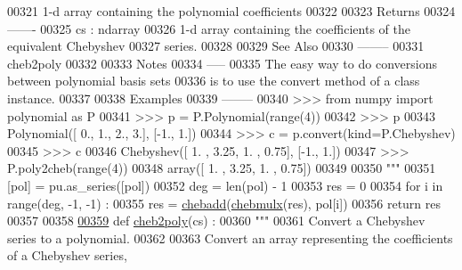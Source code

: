 \begin{DoxyCode}
00321 \textcolor{stringliteral}{        1-d array containing the polynomial coefficients}
00322 \textcolor{stringliteral}{}
00323 \textcolor{stringliteral}{    Returns}
00324 \textcolor{stringliteral}{    -------}
00325 \textcolor{stringliteral}{    cs : ndarray}
00326 \textcolor{stringliteral}{        1-d array containing the coefficients of the equivalent Chebyshev}
00327 \textcolor{stringliteral}{        series.}
00328 \textcolor{stringliteral}{}
00329 \textcolor{stringliteral}{    See Also}
00330 \textcolor{stringliteral}{    --------}
00331 \textcolor{stringliteral}{    cheb2poly}
00332 \textcolor{stringliteral}{}
00333 \textcolor{stringliteral}{    Notes}
00334 \textcolor{stringliteral}{    -----}
00335 \textcolor{stringliteral}{    The easy way to do conversions between polynomial basis sets}
00336 \textcolor{stringliteral}{    is to use the convert method of a class instance.}
00337 \textcolor{stringliteral}{}
00338 \textcolor{stringliteral}{    Examples}
00339 \textcolor{stringliteral}{    --------}
00340 \textcolor{stringliteral}{    >>> from numpy import polynomial as P}
00341 \textcolor{stringliteral}{    >>> p = P.Polynomial(range(4))}
00342 \textcolor{stringliteral}{    >>> p}
00343 \textcolor{stringliteral}{    Polynomial([ 0.,  1.,  2.,  3.], [-1.,  1.])}
00344 \textcolor{stringliteral}{    >>> c = p.convert(kind=P.Chebyshev)}
00345 \textcolor{stringliteral}{    >>> c}
00346 \textcolor{stringliteral}{    Chebyshev([ 1.  ,  3.25,  1.  ,  0.75], [-1.,  1.])}
00347 \textcolor{stringliteral}{    >>> P.poly2cheb(range(4))}
00348 \textcolor{stringliteral}{    array([ 1.  ,  3.25,  1.  ,  0.75])}
00349 \textcolor{stringliteral}{}
00350 \textcolor{stringliteral}{    """}
00351     [pol] = pu.as\_series([pol])
00352     deg = len(pol) - 1
00353     res = 0
00354     \textcolor{keywordflow}{for} i \textcolor{keywordflow}{in} range(deg, -1, -1) :
00355         res = \hyperlink{namespacepyneb_1_1utils_1_1chebyshev_a06a85eb72ae35925336a6b550dec3f02}{chebadd}(\hyperlink{namespacepyneb_1_1utils_1_1chebyshev_ab09f8accee50bd964e03071a659a7b5f}{chebmulx}(res), pol[i])
00356     \textcolor{keywordflow}{return} res
00357 
00358 
\hypertarget{chebyshev_8py_source_l00359}{}\hyperlink{namespacepyneb_1_1utils_1_1chebyshev_a640344fc14aa36e14d0e93eba4411188}{00359} \textcolor{keyword}{def }\hyperlink{namespacepyneb_1_1utils_1_1chebyshev_a640344fc14aa36e14d0e93eba4411188}{cheb2poly}(cs) :
00360     \textcolor{stringliteral}{"""}
00361 \textcolor{stringliteral}{    Convert a Chebyshev series to a polynomial.}
00362 \textcolor{stringliteral}{}
00363 \textcolor{stringliteral}{    Convert an array representing the coefficients of a Chebyshev series,}

\end{DoxyCode}

